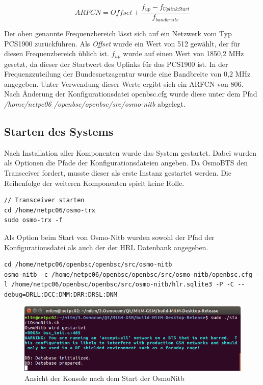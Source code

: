 \begin{equation}
ARFCN = Offset + \frac{f_{up} - f_{UplinkStart}}{f_{bandbreite}}
\end{equation}

Der oben genannte Frequenzbereich lässt sich auf ein Netzwerk vom Typ PCS1900 zurückführen. Als \textit{Offset} wurde ein Wert von 512 gewählt, der für diesen Frequenzbereich üblich ist. $f_{up}$ wurde auf einen Wert von 1850,2 MHz gesetzt, da dieser der Startwert des Uplinks für das PCS1900 ist. In der Frequenzzuteilung der Bundesnetzagentur wurde eine Bandbreite von 0,2 MHz angegeben. Unter Verwendung dieser Werte ergibt sich ein ARFCN von 806.\\

Nach Änderung der Konfigurationsdatei openbsc.cfg wurde diese unter dem Pfad \textit{/home/netpc06
/openbsc/openbsc/src/osmo-nitb} abgelegt.

\subsection{Starten des Systems}
Nach Installation aller Komponenten wurde das System gestartet. Dabei wurden als Optionen die Pfade der Konfigurationsdateien angeben. Da OsmoBTS den Transceiver fordert, musste dieser als erste Instanz gestartet werden. Die Reihenfolge der weiteren Komponenten spielt keine Rolle. 

\begin{lstlisting}
// Transceiver starten
cd /home/netpc06/osmo-trx
sudo osmo-trx -f
\end{lstlisting}

Als Option beim Start von Osmo-Nitb wurden sowohl der Pfad der Konfigurationsdatei als auch der der HRL Datenbank angegeben.
\begin{lstlisting}
cd /home/netpc06/openbsc/openbsc/src/osmo-nitb
osmo-nitb -c /home/netpc06/openbsc/openbsc/src/osmo-nitb/openbsc.cfg -l /home/netpc06/openbsc/openbsc/src/osmo-nitb/hlr.sqlite3 -P -C --debug=DRLL:DCC:DMM:DRR:DRSL:DNM
\end{lstlisting}

\begin{figure}[h] %
\centering
\includegraphics[width=15cm]{includes/Start_OsmoNitb}
\caption{Ansicht der Konsole nach dem Start der OsmoNitb}
\label{fig:OsmoNitb}
\end{figure}


